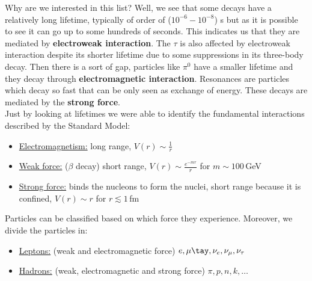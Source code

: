 \documentclass[../main.tex]{subfiles}
\begin{document}
Why are we interested in this list? Well, we see that some decays have a relatively long lifetime, typically of order of ($10^{-6}-10^{-8}$) s but as it is possible to see it can go up to some hundreds of seconds. This indicates us that they are mediated by \textbf{electroweak interaction}. The $\tau$ is also affected by electroweak interaction despite its shorter lifetime due to some suppressions in its three-body decay. Then there is a sort of gap, particles like $\pi^0$ have a smaller lifetime and they decay through \textbf{electromagnetic interaction}. Resonances are particles which decay so fast that can be only seen as exchange of energy. These decays are mediated by the \textbf{strong force}.\\
Just by looking at lifetimes we were able to identify the fundamental interactions described by the Standard Model:
\begin{itemize}
    \item \underline{Electromagnetism:} long range, $V(r)\sim\frac{1}{r}$
    \item \underline{Weak force:} ($\beta$ decay) short range, $V(r)\sim \frac{e^{-mr}}{r}$ for $m\sim100$\,GeV
    \item \underline{Strong force:} binds the nucleons to form the nuclei, short range because it is confined, $V(r)\sim r$ for $r\lesssim1$\,fm
\end{itemize}
Particles can be classified based on which force they experience. Moreover, we divide the particles in:
\begin{itemize}
    \item \underline{Leptons:} (weak and electromagnetic force) $e,\mu\tay,\nu_e,\nu_\mu,\nu_\tau$
    \item \underline{Hadrons:} (weak, electromagnetic and strong force) $\pi,p,n,k,\dots$
\end{itemize}
\end{document}
